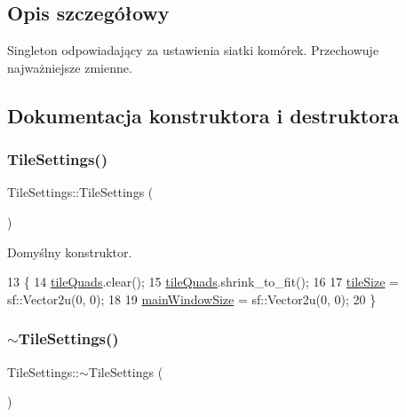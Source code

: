 \subsection{Opis szczegółowy}
Singleton odpowiadający za ustawienia siatki komórek. Przechowuje najważniejsze zmienne. 

\subsection{Dokumentacja konstruktora i destruktora}
\mbox{\label{class_tile_settings_a5903073619b7b4bf85a2dc3548db84fe}} 
\subsubsection{\texorpdfstring{Tile\+Settings()}{TileSettings()}}
{\footnotesize\ttfamily Tile\+Settings\+::\+Tile\+Settings (\begin{DoxyParamCaption}{ }\end{DoxyParamCaption})\hspace{0.3cm}{\ttfamily [private]}}

Domyślny konstruktor. 
\begin{DoxyCode}
13 \{
14     \mbox{\hyperlink{class_tile_settings_ac37d7b95a1e2266d38de0a70a907efb3}{tileQuads}}.clear();
15     \mbox{\hyperlink{class_tile_settings_ac37d7b95a1e2266d38de0a70a907efb3}{tileQuads}}.shrink\_to\_fit();
16 
17     \mbox{\hyperlink{class_tile_settings_ae4be54be3619d21d536ce13b7354f165}{tileSize}} = sf::Vector2u(0, 0);
18 
19     \mbox{\hyperlink{class_tile_settings_a2b24689813e0082b59df113b754778c2}{mainWindowSize}} = sf::Vector2u(0, 0);
20 \}
\end{DoxyCode}
\mbox{\label{class_tile_settings_a4e8a5a736c71cec9e60a49d5cafca150}} 
\subsubsection{\texorpdfstring{$\sim$\+Tile\+Settings()}{~TileSettings()}}
{\footnotesize\ttfamily Tile\+Settings\+::$\sim$\+Tile\+Settings (\begin{DoxyParamCaption}{ }\end{DoxyParamCaption})\hspace{0.3cm}{\ttfamily [private]}}

